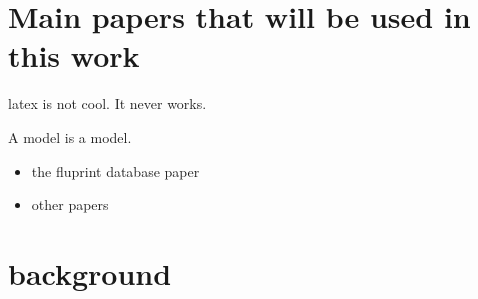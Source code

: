 



\makeglossaries




\tableofcontents
\printglossary[type=bus]
\printglossary[type=dm]

\section{Main papers that will be used in this work}

\Gls{latex} is not cool. It never works.

A \gls{model} is a model.

\begin{itemize}
    \item the fluprint database paper \cite{tomicFluPRINTDatasetMultidimensional2019}
    \item other papers
\end{itemize}

\section{background}


